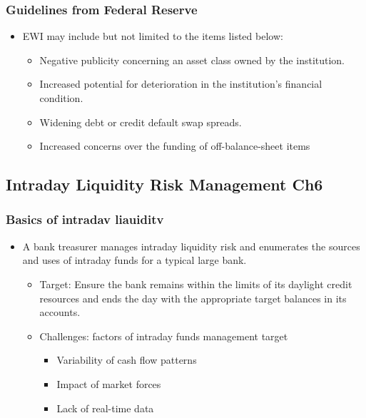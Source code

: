 \subsubsection{Guidelines from Federal Reserve}
\begin{itemize}
\item EWI may include but not limited to the items listed below:
    \begin{itemize}
    \item Negative publicity concerning an asset class owned by the institution.
    \item Increased potential for deterioration in the institution's financial condition.
    \item Widening debt or credit default swap spreads.
    \item Increased concerns over the funding of off-balance-sheet items
    \end{itemize}
    
\end{itemize}


\subsection{Intraday Liquidity Risk Management Ch6}

\subsubsection{Basics of intradav liauiditv}
\begin{itemize}
\item A bank treasurer manages intraday liquidity risk and enumerates the sources and uses of intraday funds for a typical large bank.
    \begin{itemize}
    \item Target: Ensure the bank remains within the limits of its daylight credit resources and ends the day with the appropriate target balances in its accounts.
    \item Challenges: factors of intraday funds management target
        \begin{itemize}
        \item Variability of cash flow patterns
        \item Impact of market forces
        \item Lack of real-time data
        \end{itemize}
    
    \end{itemize}
    
\end{itemize}



